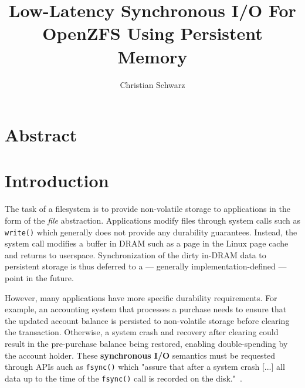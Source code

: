 \documentclass[12pt,a4paper,twoside,draft]{book}
\begin{document}
\frontmatter
{}

\title{Low-Latency Synchronous I/O For OpenZFS Using Persistent Memory}
\author{Christian Schwarz}
\maketitle



\chapter{Abstract}
\blindtext

\mainmatter
\cleardoublepage
{}
{}
\tableofcontents

\chapter{Introduction}
The task of a filesystem is to provide non-volatile storage to applications in the form of the \textit{file} abstraction.
Applications modify files through system calls such as \lstinline{write()} which generally does not provide any durability guarantees.
Instead, the system call modifies a buffer in DRAM such as a page in the Linux page cache and returns to userspace.
Synchronization of the dirty in-DRAM data to persistent storage is thus deferred to a --- generally implementation-defined --- point in the future.

However, many applications have more specific durability requirements.
For example, an accounting system that processes a purchase needs to ensure that the updated account balance is persisted to non-volatile storage before clearing the transaction.
Otherwise, a system crash and recovery after clearing could result in the pre-purchase balance being restored, enabling double-spending by the account holder.
These \textbf{synchronous I/O} semantics must be requested through APIs auch as \lstinline{fsync()} which "assure that after a system crash [...] all data up to the time of the \lstinline{fsync()} call is recorded on the disk."~\cite{posix_fsync_opengroup}.
\end{document}
